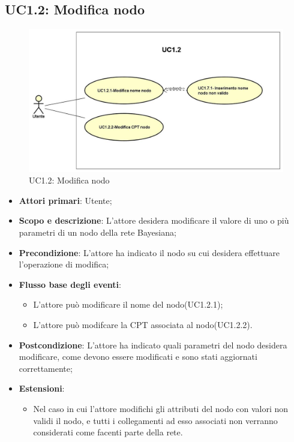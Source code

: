 \subsection{UC1.2: Modifica nodo} 
\hypertarget{UC1.2}{} 
\begin{figure} [H]
	\centering
	\includegraphics[scale=0.45]{Img/UC1-2} 
	\caption{UC1.2: Modifica nodo} \label{} 
\end{figure} 
\begin{itemize} 
	\item{\textbf{Attori primari}: Utente;} 
	\item{\textbf{Scopo e descrizione}: L'attore desidera modificare il valore di uno o più parametri di un nodo della rete Bayesiana;} 
	\item{\textbf{Precondizione}: L'attore ha indicato il nodo su cui desidera effettuare l'operazione di modifica;} 
	\item{\textbf{Flusso base degli eventi}: } 
	\begin{itemize} 
		\item{L'attore può modificare il nome del nodo(UC1.2.1);} 
		\item{L'attore può modifcare la CPT associata al nodo(UC1.2.2).} 		
	\end{itemize} 
	\item{\textbf{Postcondizione}: L'attore ha indicato quali parametri del nodo desidera modificare, come devono essere modificati e sono stati aggiornati correttamente;} 
	\item{\textbf{Estensioni}:} 
	\begin{itemize} 
		\item{Nel caso in cui l'attore modifichi gli attributi del nodo con valori non validi il nodo, e tutti i collegamenti ad esso associati non verranno considerati come facenti parte della rete.} 
	\end{itemize} 
\end{itemize} 

